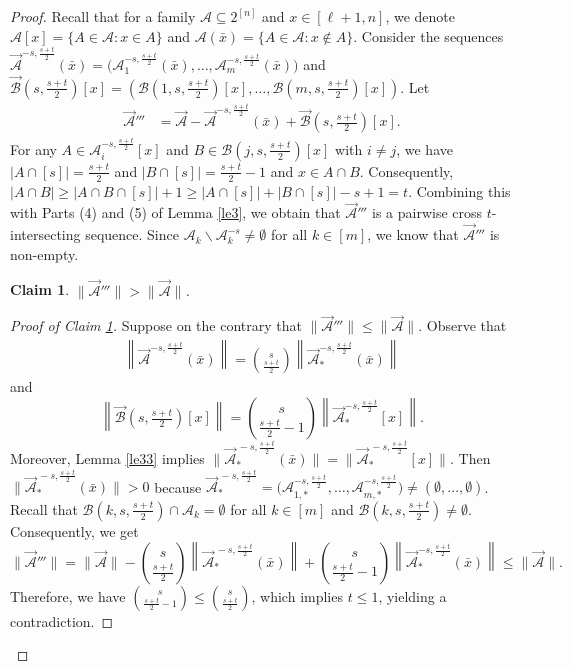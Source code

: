 \documentclass[11pt,a4paper]{article}
\newtheorem{claim}{Claim}
\begin{document}
\begin{proof}
Recall that for a family $\mathcal{A}\subseteq 2^{[n]}$ and $x\in[\ell+1, n]$, we denote $\mathcal{A}[x]=\{A\in \mathcal{A}: x\in A\}$ and $\mathcal{A}(\bar{x})=\{A\in \mathcal{A}: x\notin A\}$.
Consider the sequences
$\vec{\mathcal{A}}^{-s,\frac{s+t}{2}}(\bar{x}) = \Big(\mathcal{A}_1^{-s,\frac{s+t}{2}}(\bar{x}), \ldots, \mathcal{A}_m^{-s,\frac{s+t}{2}}(\bar{x})\Big)$ and  $\vec{\mathcal{B}}(s,\frac{s+t}{2})[x] = \left(\mathcal{B}(1,s, \frac{s+t}{2})[x], \ldots, \mathcal{B}(m,s, \frac{s+t}{2})[x]\right)$.
Let 
\begin{align*}
 \vec{\mathcal{A}}'''&= \vec{\mathcal{A}}- \vec{\mathcal{A}}^{-s,\tfrac{s+t}{2}}(\bar{x})+\vec{\mathcal{B}}(s,\tfrac{s+t}{2})[x].
\end{align*}
 { For any $A\in \mathcal{A}_i^{-s,\frac{s+t}{2}}[x]$
and $B\in  \mathcal{B}(j,s, \frac{s+t}{2})[x]$ with $i\neq j$, we have $|A\cap [s]|= \frac{s+t}{2}$ and $|B\cap [s]|=\frac{s+t}{2}-1$ and $x\in A\cap B$.
Consequently, $|A\cap B|\geq |A\cap B\cap [s]|+1\geq |A\cap [s]|+|B\cap [s]|-s+1=t$.}
Combining this with Parts (4) and (5) of Lemma \ref{le3},  we obtain that 
$\vec{\mathcal{A}}'''$ is  a pairwise cross $t$-intersecting sequence.
Since $\mathcal{A}_k\backslash \mathcal{A}_k^{-s}\neq \emptyset$ for all $k\in [m]$, we know that $\vec{\mathcal{A}}'''$ is  non-empty.
\begin{claim}\label{cl2}
$ \|\vec{\mathcal{A}}'''\|>\|\vec{\mathcal{A}}\|$.
\end{claim}

\begin{proof}[Proof of Claim \ref{cl2}]
Suppose on the contrary that $\|\vec{\mathcal{A}}'''\|\leq\|\vec{\mathcal{A}}\|$.
Observe that 
\begin{align*}
\left\|\vec{\mathcal{A}}^{-s,\frac{s+t}{2}}(\bar{x}) \right\|= \binom{s}{\frac{s+t}{2}} 
\left\|\vec{\mathcal{A}}_*^{-s,\frac{s+t}{2}}(\bar{x})\right\|
\end{align*}
and 
\[ \left\|\vec{\mathcal{B}}(s,\tfrac{s+t}{2})[x] \right\| =\binom{s}{\frac{s+t}{2}-1} 
\left\|\vec{\mathcal{A}}_*^{-s,\frac{s+t}{2}}[x]\right\|. \]
Moreover, Lemma \ref{le33} implies $\Big\|\vec{\mathcal{A}}_*^{\, -s,\frac{s+t}{2}}(\bar{x}) \Big\|= \Big\|\vec{\mathcal{A}}_*^{\, -s,\frac{s+t}{2}}[x] \Big\|$. Then $\Big\|\vec{\mathcal{A}}_*^{\, -s,\frac{s+t}{2}}(\bar{x}) \Big\|>0$ because $\vec{\mathcal{A}}_*^{\, -s,\frac{s+t}{2}}=\Big(\mathcal{A}_{1,*}^{-s,\frac{s+t}{2}}, \ldots, \mathcal{A}_{m,*}^{-s,\frac{s+t}{2}}\Big) \neq(\emptyset,\ldots, \emptyset)$. 
Recall that $\mathcal{B}(k,s, \frac{s+t}{2})\cap \mathcal{A}_{k}=\emptyset$ for all $k\in[m]$ and $\mathcal{B}(k,s, \frac{s+t}{2})\neq \emptyset$.
Consequently, we get 
$$\|\vec{\mathcal{A}}'''\| 
=\|\vec{\mathcal{A}}\|-\binom{s}{\frac{s+t}{2}} \left\|\vec{\mathcal{A}}_*^{\,-s,\frac{s+t}{2}}(\bar{x}) \right\|+\binom{s}{\frac{s+t}{2}-1} \left\|\vec{\mathcal{A}}_*^{-s,\frac{s+t}{2}}(\bar{x})\right\| 
\leq \|\vec{\mathcal{A}} \|.$$
Therefore, we have $\binom{s}{\frac{s+t}{2}-1}\leq \binom{s}{\frac{s+t}{2}}$, which implies $t\leq 1$, yielding a contradiction.
\end{proof} 





\end{proof}
\end{document}
